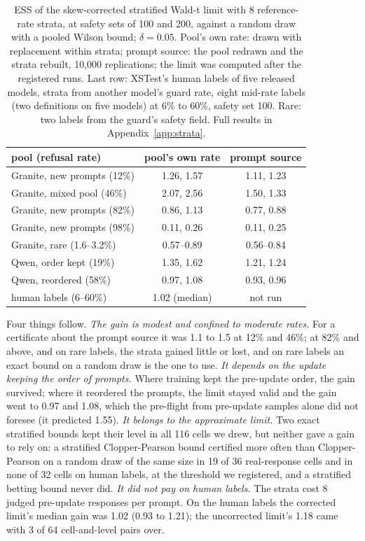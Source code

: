 \documentclass[letterpaper]{article} %
\newcommand{\SWT}{stratified Wald-t limit}
\begin{document}
\begin{table}[t]
\centering
\small
\setlength{\tabcolsep}{3.5pt}
\begin{tabular}{@{}p{3.65cm}cc@{}}
\toprule
pool (refusal rate) & pool's own rate & prompt source \\
\midrule
Granite, new prompts (12\%) & 1.26, 1.57 & 1.11, 1.23 \\
Granite, mixed pool (46\%) & 2.07, 2.56 & 1.50, 1.33 \\
Granite, new prompts (82\%) & 0.86, 1.13 & 0.77, 0.88 \\
Granite, new prompts (98\%) & 0.11, 0.26 & 0.11, 0.25 \\
Granite, rare (1.6--3.2\%) & 0.57--0.89 & 0.56--0.84 \\
Qwen, order kept (19\%) & 1.35, 1.62 & 1.21, 1.24 \\
Qwen, reordered (58\%) & 0.97, 1.08 & 0.93, 0.96 \\
human labels (6--60\%) & 1.02 (median) & not run \\
\bottomrule
\end{tabular}
\caption{ESS of the skew-corrected \SWT{} with 8 reference-rate strata, at safety sets of 100 and 200, against a random draw with a
pooled Wilson bound; $\delta=0.05$. Pool's own rate: drawn with replacement within strata; prompt source: the pool
redrawn and the strata rebuilt, 10,000 replications; the limit was computed after the registered runs. Last row: XSTest's human labels of five released
models, strata from another model's guard rate, eight mid-rate labels (two definitions on five models)
at 6\% to 60\%, safety set 100. Rare: two labels
from the guard's safety field. Full results in Appendix~\ref{app:strata}.}
\label{tab:strata}
\end{table}

Four things follow. \emph{The gain is modest and confined to moderate rates.} For a certificate about the prompt source it
was 1.1 to 1.5 at 12\% and 46\%; at 82\% and above, and on rare labels, the strata gained little or lost, and on rare
labels an exact bound on a random draw is the one to use. \emph{It depends on the update keeping the order of
prompts.} Where training kept the pre-update order, the gain survived; where it reordered the prompts, the limit stayed
valid and the gain went to 0.97 and 1.08, which the pre-flight from pre-update samples alone did not foresee (it
predicted 1.55). \emph{It belongs to the approximate limit.} Two exact stratified bounds kept their level in all 116
cells we drew, but neither gave a gain to rely on: a stratified Clopper-Pearson bound certified more often than
Clopper-Pearson on a random draw of the same size in 19 of 36 real-response cells and in none of 32 cells on human
labels, at the threshold we registered, and a stratified betting bound never did. \emph{It did not pay on human labels.} The strata
cost 8 judged pre-update responses per prompt. On the human labels the corrected limit's median gain was 1.02 (0.93 to
1.21); the uncorrected limit's 1.18 came with 3 of 64 cell-and-level pairs over.
\end{document}
